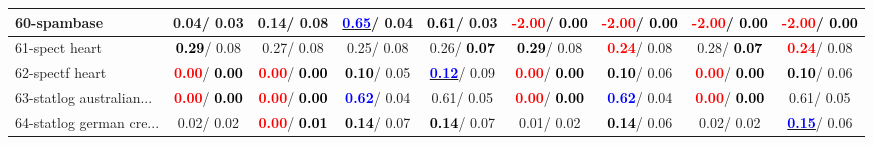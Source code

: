 \begin{table}[h]
\begin{center}
\begin{tabular}{lc|c|c|c|c|c|c|c}
60-spambase &   0.04/  0.03 &   0.14/  0.08 & \underline{\textcolor{blue}{\textbf{  0.65}}}/  0.04 & \textcolor{black}{\textbf{  0.61}}/  0.03 & \textcolor{red}{\textbf{ -2.00}}/\textcolor{black}{\textbf{  0.00}} & \textcolor{red}{\textbf{ -2.00}}/\textcolor{black}{\textbf{  0.00}} & \textcolor{red}{\textbf{ -2.00}}/\textcolor{black}{\textbf{  0.00}} & \textcolor{red}{\textbf{ -2.00}}/\textcolor{black}{\textbf{  0.00}} \\ \hline
61-spect heart & \textcolor{black}{\textbf{  0.29}}/  0.08 &   0.27/  0.08 &   0.25/  0.08 &   0.26/\textcolor{black}{\textbf{  0.07}} & \textcolor{black}{\textbf{  0.29}}/  0.08 & \textcolor{red}{\textbf{  0.24}}/  0.08 &   0.28/\textcolor{black}{\textbf{  0.07}} & \textcolor{red}{\textbf{  0.24}}/  0.08 \\
62-spectf heart & \textcolor{red}{\textbf{  0.00}}/\textcolor{black}{\textbf{  0.00}} & \textcolor{red}{\textbf{  0.00}}/\textcolor{black}{\textbf{  0.00}} & \textcolor{black}{\textbf{  0.10}}/  0.05 & \underline{\textcolor{blue}{\textbf{  0.12}}}/  0.09 & \textcolor{red}{\textbf{  0.00}}/\textcolor{black}{\textbf{  0.00}} & \textcolor{black}{\textbf{  0.10}}/  0.06 & \textcolor{red}{\textbf{  0.00}}/\textcolor{black}{\textbf{  0.00}} & \textcolor{black}{\textbf{  0.10}}/  0.06 \\
63-statlog australian... & \textcolor{red}{\textbf{  0.00}}/\textcolor{black}{\textbf{  0.00}} & \textcolor{red}{\textbf{  0.00}}/\textcolor{black}{\textbf{  0.00}} & \textcolor{blue}{\textbf{  0.62}}/  0.04 &   0.61/  0.05 & \textcolor{red}{\textbf{  0.00}}/\textcolor{black}{\textbf{  0.00}} & \textcolor{blue}{\textbf{  0.62}}/  0.04 & \textcolor{red}{\textbf{  0.00}}/\textcolor{black}{\textbf{  0.00}} &   0.61/  0.05 \\
64-statlog german cre... &   0.02/  0.02 & \textcolor{red}{\textbf{  0.00}}/\textcolor{black}{\textbf{  0.01}} & \textcolor{black}{\textbf{  0.14}}/  0.07 & \textcolor{black}{\textbf{  0.14}}/  0.07 &   0.01/  0.02 & \textcolor{black}{\textbf{  0.14}}/  0.06 &   0.02/  0.02 & \underline{\textcolor{blue}{\textbf{  0.15}}}/  0.06 \\\end{tabular}\label{stratsALCKappa1bSVM}
\end{center}
\end{table}
